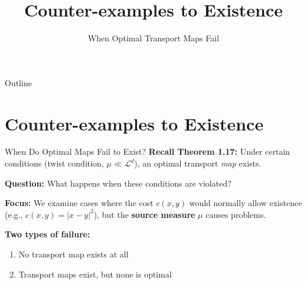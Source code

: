 \documentclass[aspectratio=169]{beamer}
\title{Counter-examples to Existence}
\subtitle{When Optimal Transport Maps Fail}
\author{}
\date{}
\begin{document}
\begin{frame}
\titlepage
\end{frame}

\begin{frame}{Outline}
\tableofcontents[hideallsubsections]
\end{frame}

\section{Counter-examples to Existence}

\begin{frame}{When Do Optimal Maps Fail to Exist?}
\textbf{Recall Theorem 1.17:} Under certain conditions (twist condition, $\mu \ll \mathcal{L}^d$), an optimal transport \emph{map} exists.

\vspace{0.4cm}
\textbf{Question:} What happens when these conditions are violated?

\vspace{0.4cm}
\textbf{Focus:} We examine cases where the cost $c(x,y)$ would normally allow existence (e.g., $c(x,y) = |x-y|^2$), but the \textbf{source measure} $\mu$ causes problems.

\vspace{0.4cm}
\textbf{Two types of failure:}
\begin{enumerate}
    \item No transport map exists at all
    \item Transport maps exist, but none is optimal
\end{enumerate}
\end{frame}
\end{document}
